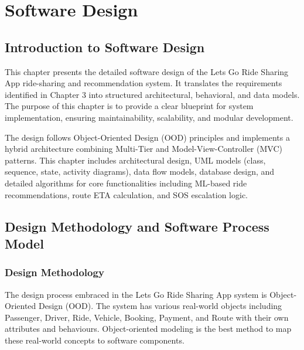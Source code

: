 \chapter{Software Design}

\section{Introduction to Software Design}

This chapter presents the detailed software design of the Lets Go Ride Sharing App ride-sharing and recommendation system. It translates the requirements identified in Chapter 3 into structured architectural, behavioral, and data models. The purpose of this chapter is to provide a clear blueprint for system implementation, ensuring maintainability, scalability, and modular development.

The design follows Object-Oriented Design (OOD) principles and implements a hybrid architecture combining Multi-Tier and Model-View-Controller (MVC) patterns. This chapter includes architectural design, UML models (class, sequence, state, activity diagrams), data flow models, database design, and detailed algorithms for core functionalities including ML-based ride recommendations, route ETA calculation, and SOS escalation logic.

\section{Design Methodology and Software Process Model}

\subsection{Design Methodology}

The design process embraced in the Lets Go Ride Sharing App system is Object-Oriented Design (OOD). The system has various real-world objects including Passenger, Driver, Ride, Vehicle, Booking, Payment, and Route with their own attributes and behaviours. Object-oriented modeling is the best method to map these real-world concepts to software components.

